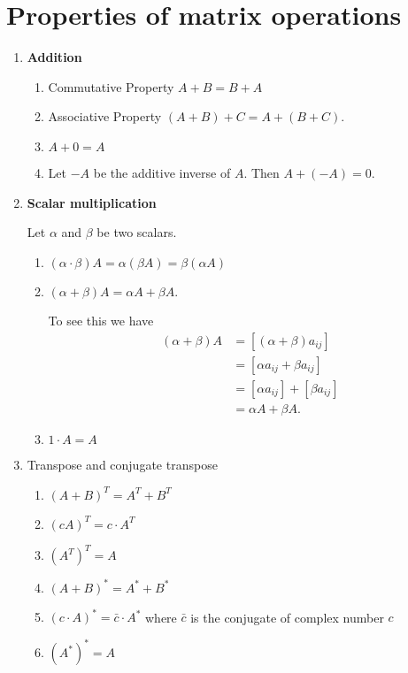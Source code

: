 \documentclass[12pt]{article}
\theoremstyle{definition}
\begin{document}
\section{Properties of matrix operations}

\begin{enumerate}[label=\Roman*)]
\item \textbf{Addition}

\begin{enumerate}
\item Commutative Property $A + B = B + A$

\item Associative Property
$(A + B) + C = A + (B + C)$.

\item $A + 0 = A$

\item Let $-A$ be the additive inverse of $A$. Then $A + (-A) = 0$.
\end{enumerate}

\item \textbf{Scalar multiplication}

Let $\alpha$ and $\beta$ be two scalars.

\begin{enumerate}
\item $(\alpha \cdot \beta)A = \alpha(\beta A) = \beta (\alpha A)$

\item $(\alpha + \beta)A = \alpha A + \beta A$.

To see this we have
\begin{align*}
(\alpha + \beta)A &= [(\alpha + \beta)a_{ij}] \\
&= [\alpha a_{ij} + \beta a_{ij}] \\
&= [\alpha a_{ij}] + [\beta a_{ij}] \\
&= \alpha A + \beta A.
\end{align*}

\item $1 \cdot A = A$
\end{enumerate}


\item Transpose and conjugate transpose

\begin{enumerate}
\item $(A + B)^T = A^T + B^T$
\item $(cA)^T = c \cdot A^T$
\item $(A^T)^T = A$
\item $(A + B)^{*} = A^* + B^*$
\item $(c \cdot A)^* = \bar{c} \cdot A^*$ where $\bar{c}$ is the conjugate of
complex number $c$
\item $(A^*)^* = A$
\end{enumerate}


\end{enumerate}
\end{document}
